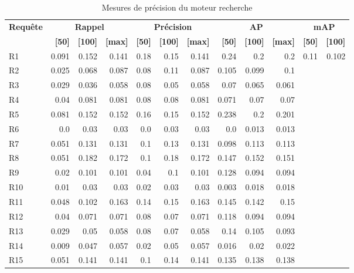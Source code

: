 \begin{table}[H]
\centering
\begin{tabular}{l|rrr|rrr|rrr|rr}
\toprule
\textbf{Requête} & \multicolumn{3}{c}{\textbf{Rappel}} & \multicolumn{3}{c}{\textbf{Précision}} & \multicolumn{3}{c}{\textbf{AP}} & \multicolumn{2}{c}{\textbf{mAP}} \\
 & \textbf{[50]} & \textbf{[100]} & \textbf{[max]} & \textbf{[50]} & \textbf{[100]} & \textbf{[max]} & \textbf{[50]} & \textbf{[100]} & \textbf{[max]} & \textbf{[50]} & \textbf{[100]} \\
\midrule
R1 & 0.091 & 0.152 & 0.141 & 0.18 & 0.15 & 0.141 & 0.24 & 0.2 & 0.2 & \multirow{15}{*}{0.11} & \multirow{15}{*}{0.102} \\
R2 & 0.025 & 0.068 & 0.087 & 0.08 & 0.11 & 0.087 & 0.105 & 0.099 & 0.1 \\
R3 & 0.029 & 0.036 & 0.058 & 0.08 & 0.05 & 0.058 & 0.07 & 0.065 & 0.061 \\
R4 & 0.04 & 0.081 & 0.081 & 0.08 & 0.08 & 0.081 & 0.071 & 0.07 & 0.07 \\
R5 & 0.081 & 0.152 & 0.152 & 0.16 & 0.15 & 0.152 & 0.238 & 0.2 & 0.201 \\
R6 & 0.0 & 0.03 & 0.03 & 0.0 & 0.03 & 0.03 & 0.0 & 0.013 & 0.013 \\
R7 & 0.051 & 0.131 & 0.131 & 0.1 & 0.13 & 0.131 & 0.098 & 0.113 & 0.113 \\
R8 & 0.051 & 0.182 & 0.172 & 0.1 & 0.18 & 0.172 & 0.147 & 0.152 & 0.151 \\
R9 & 0.02 & 0.101 & 0.101 & 0.04 & 0.1 & 0.101 & 0.128 & 0.094 & 0.094 \\
R10 & 0.01 & 0.03 & 0.03 & 0.02 & 0.03 & 0.03 & 0.003 & 0.018 & 0.018 \\
R11 & 0.048 & 0.102 & 0.163 & 0.14 & 0.15 & 0.163 & 0.145 & 0.142 & 0.15 \\
R12 & 0.04 & 0.071 & 0.071 & 0.08 & 0.07 & 0.071 & 0.118 & 0.094 & 0.094 \\
R13 & 0.029 & 0.05 & 0.058 & 0.08 & 0.07 & 0.058 & 0.14 & 0.105 & 0.093 \\
R14 & 0.009 & 0.047 & 0.057 & 0.02 & 0.05 & 0.057 & 0.016 & 0.02 & 0.022 \\
R15 & 0.051 & 0.141 & 0.141 & 0.1 & 0.14 & 0.141 & 0.135 & 0.138 & 0.138 \\
\bottomrule
\end{tabular}
\caption{Mesures de précision du moteur recherche}
\label{tab:results}
\end{table}
